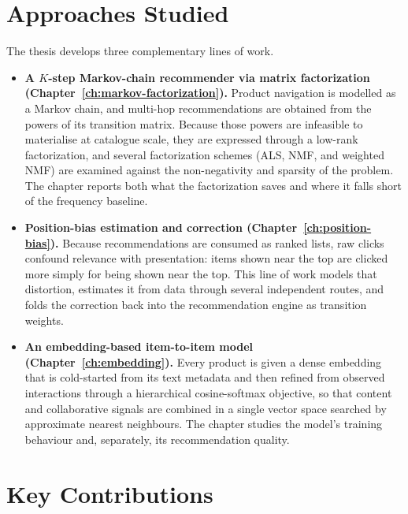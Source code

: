 \section{Approaches Studied}
\label{sec:intro-approaches}

The thesis develops three complementary lines of work.

\begin{itemize}
  \item \textbf{A $K$-step Markov-chain recommender via matrix factorization
        (Chapter~\ref{ch:markov-factorization}).} Product navigation is modelled
        as a Markov chain, and multi-hop recommendations are obtained from the
        powers of its transition matrix. Because those powers are infeasible to
        materialise at catalogue scale, they are expressed through a low-rank
        factorization, and several factorization schemes (ALS, NMF, and
        weighted NMF) are examined against the non-negativity and sparsity of the
        problem. The chapter reports both what the factorization saves and where
        it falls short of the frequency baseline.
  \item \textbf{Position-bias estimation and correction
        (Chapter~\ref{ch:position-bias}).} Because recommendations are consumed
        as ranked lists, raw clicks confound relevance with presentation: items
        shown near the top are clicked more simply for being shown near the top.
        This line of work models that distortion, estimates it from data through
        several independent routes, and folds the correction back into the
        recommendation engine as transition weights.
  \item \textbf{An embedding-based item-to-item model
        (Chapter~\ref{ch:embedding}).} Every product is given a dense embedding
        that is cold-started from its text metadata and then refined from observed
        interactions through a hierarchical cosine-softmax objective, so that
        content and collaborative signals are combined in a single vector space
        searched by approximate nearest neighbours. The chapter studies the
        model's training behaviour and, separately, its recommendation quality.
\end{itemize}

\section*{Key Contributions}

